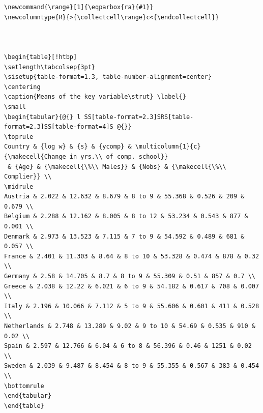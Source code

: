 \documentclass[12pt,a4paper]{article}
\begin{document}
\begin{verbatim}
\newcommand{\range}[1]{\eqparbox{ra}{#1}}
\newcolumntype{R}{>{\collectcell\range}c<{\endcollectcell}}



\begin{table}[!htbp]
\setlength\tabcolsep{3pt}
\sisetup{table-format=1.3, table-number-alignment=center}
\centering
\caption{Means of the key variable\strut} \label{}
\small
\begin{tabular}{@{} l SS[table-format=2.3]SRS[table-format=2.3]SS[table-format=4]S @{}}
\toprule
Country & {log w} & {s} & {ycomp} & \multicolumn{1}{c}{\makecell{Change in yrs.\\ of comp. school}}
 & {Age} & {\makecell{\%\\ Males}} & {Nobs} & {\makecell{\%\\ Complier}} \\
\midrule 
Austria & 2.022 & 12.632 & 8.679 & 8 to 9 & 55.368 & 0.526 & 209 & 0.679 \\ 
Belgium & 2.288 & 12.162 & 8.005 & 8 to 12 & 53.234 & 0.543 & 877 & 0.001 \\ 
Denmark & 2.973 & 13.523 & 7.115 & 7 to 9 & 54.592 & 0.489 & 681 & 0.057 \\ 
France & 2.401 & 11.303 & 8.64 & 8 to 10 & 53.328 & 0.474 & 878 & 0.32 \\ 
Germany & 2.58 & 14.705 & 8.7 & 8 to 9 & 55.309 & 0.51 & 857 & 0.7 \\ 
Greece & 2.038 & 12.22 & 6.021 & 6 to 9 & 54.182 & 0.617 & 708 & 0.007 \\ 
Italy & 2.196 & 10.066 & 7.112 & 5 to 9 & 55.606 & 0.601 & 411 & 0.528 \\ 
Netherlands & 2.748 & 13.289 & 9.02 & 9 to 10 & 54.69 & 0.535 & 910 & 0.02 \\ 
Spain & 2.597 & 12.766 & 6.04 & 6 to 8 & 56.396 & 0.46 & 1251 & 0.02 \\ 
Sweden & 2.039 & 9.487 & 8.454 & 8 to 9 & 55.355 & 0.567 & 383 & 0.454 \\ 
\bottomrule
\end{tabular} 
\end{table} 
\end{verbatim}
\end{document}
